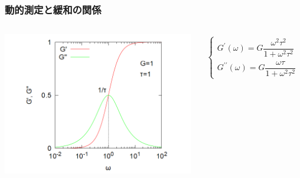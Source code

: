 \documentclass[unicode,12pt]{beamer}%
\begin{document}
\begin{frame}
	\frametitle{動的測定と緩和の関係}
		\vspace{-3mm}
		\begin{columns}[c, onlytextwidth]
					\centering
					\includegraphics[width=\textwidth]{maxwell_dynamic.png}

					\vspace{-5mm}
					\begin{align*}
						\begin{cases}
							G^{\prime}(\omega) = G\dfrac{\omega^2 \tau^2}{1+\omega^2\tau^2} \\[12pt]
							G^{\prime \prime}(\omega) = G\dfrac{\omega \tau}{1+\omega^2\tau^2}
						\end{cases}
					\end{align*}
				

\end{columns}
\end{frame}
\end{document}
